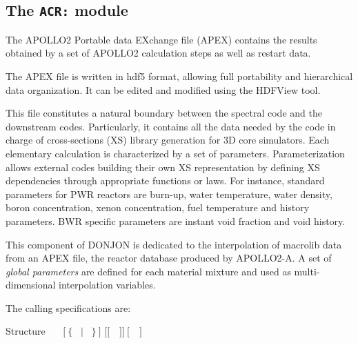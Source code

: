 \subsection{The {\tt ACR:} module}\label{sect:ACRData}

The APOLLO2 Portable data EXchange file (APEX) contains the results obtained by a set of APOLLO2 calculation steps as well as restart data.

The APEX file is written in {\sc hdf5} format, allowing full portability and hierarchical data organization. It can be edited and modified using
the HDFView tool.

This file constitutes a natural boundary between the spectral code and the downstream codes. Particularly, it contains all the data needed by the
code in charge of cross-sections (XS) library generation for 3D core simulators.
Each elementary calculation is characterized by a set of parameters. Parameterization allows external codes building their own XS representation
by defining XS dependencies through appropriate functions or laws. For instance, standard parameters for PWR reactors are burn-up, water temperature,
water density, boron concentration, xenon concentration, fuel temperature and history parameters. BWR specific parameters are instant void fraction and
void history.

This component of DONJON is dedicated to the interpolation of {\sc macrolib} data from an APEX file, the reactor database produced by APOLLO2-A.\cite{apollo2A}
A set of {\sl global parameters} are defined for each material mixture and used as multi-dimensional interpolation variables.

\vskip 0.02cm

The calling specifications are:

\begin{DataStructure}{Structure }
~\moc{:=}~~$[~\{$~ $|$ ~$\}~]$  $[[$~~$]]~[$~~$]$~\moc{::}~ \\
\end{DataStructure}

